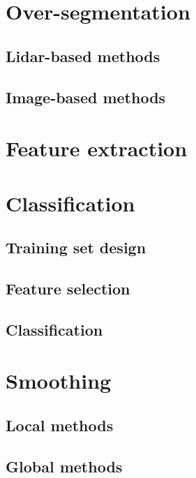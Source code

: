 \section{Over-segmentation}

\subsection{Lidar-based methods}

\subsection{Image-based methods}

\section{Feature extraction}

\section{Classification}

\subsection{Training set design}

\subsection{Feature selection}

\subsection{Classification}

\section{Smoothing}

\subsection{Local methods}

\subsection{Global methods}

\stopcontents[chapters]